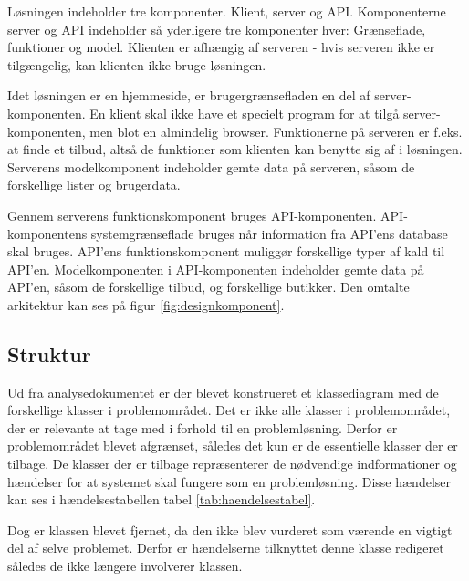 
Løsningen indeholder tre komponenter. Klient, server og API. Komponenterne server og API indeholder så yderligere tre komponenter hver: Grænseflade, funktioner og model. Klienten er afhængig af serveren - hvis serveren ikke er tilgængelig, kan klienten ikke bruge løsningen.

Idet løsningen er en hjemmeside, er brugergrænsefladen en del af server-komponenten. En klient skal ikke have et specielt program for at tilgå server-komponenten, men blot en almindelig browser. Funktionerne på serveren er f.eks. at finde et tilbud, altså de funktioner som klienten kan benytte sig af i løsningen. Serverens modelkomponent indeholder gemte data på serveren, såsom de forskellige lister og brugerdata.

Gennem serverens funktionskomponent bruges API-komponenten. API-komponentens systemgrænseflade bruges når information fra API'ens database skal bruges. API'ens funktionskomponent muliggør forskellige typer af kald til API'en. Modelkomponenten i API-komponenten indeholder gemte data på API'en, såsom de forskellige tilbud, og forskellige butikker. Den omtalte arkitektur kan ses på figur \ref{fig:designkomponent}.


\subsection{Struktur}
Ud fra analysedokumentet er der blevet konstrueret et klassediagram med de forskellige klasser i problemområdet. Det er ikke alle klasser i problemområdet, der er relevante at tage med i forhold til en problemløsning. Derfor er problemområdet blevet afgrænset, således det kun er de essentielle klasser der er tilbage. De klasser der er tilbage repræsenterer de nødvendige indformationer og hændelser for at systemet skal fungere som en problemløsning. Disse hændelser kan ses i hændelsestabellen tabel \ref{tab:haendelsestabel}.

Dog er klassen  blevet fjernet, da den ikke blev vurderet som værende en vigtigt del af selve problemet. Derfor er hændelserne tilknyttet denne klasse redigeret således de ikke længere involverer klassen.

